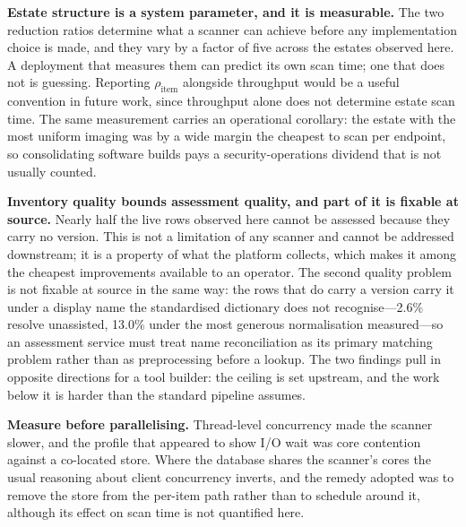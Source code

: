 \documentclass[fleqn,10pt,lineno]{wlpeerj}
\begin{document}
\textbf{Estate structure is a system parameter, and it is measurable.} The two reduction ratios determine what a scanner can achieve before any implementation choice is made, and they vary by a factor of five across the estates observed here. A deployment that measures them can predict its own scan time; one that does not is guessing. Reporting $\rho_{\text{item}}$ alongside throughput would be a useful convention in future work, since throughput alone does not determine estate scan time. The same measurement carries an operational corollary: the estate with the most uniform imaging was by a wide margin the cheapest to scan per endpoint, so consolidating software builds pays a security-operations dividend that is not usually counted.

\textbf{Inventory quality bounds assessment quality, and part of it is fixable at source.} Nearly half the live rows observed here cannot be assessed because they carry no version. This is not a limitation of any scanner and cannot be addressed downstream; it is a property of what the platform collects, which makes it among the cheapest improvements available to an operator. The second quality problem is not fixable at source in the same way: the rows that do carry a version carry it under a display name the standardised dictionary does not recognise---2.6\% resolve unassisted, 13.0\% under the most generous normalisation measured---so an assessment service must treat name reconciliation as its primary matching problem rather than as preprocessing before a lookup. The two findings pull in opposite directions for a tool builder: the ceiling is set upstream, and the work below it is harder than the standard pipeline assumes.

\textbf{Measure before parallelising.} Thread-level concurrency made the scanner slower, and the profile that appeared to show I/O wait was core contention against a co-located store. Where the database shares the scanner's cores the usual reasoning about client concurrency inverts, and the remedy adopted was to remove the store from the per-item path rather than to schedule around it, although its effect on scan time is not quantified here.
\end{document}

